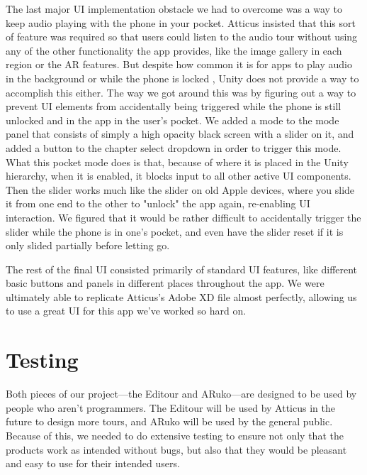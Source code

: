 \documentclass[a4paper, 10pt, american, titlepage]{article}
\begin{document}
The last major UI implementation obstacle we had to overcome was a way to keep
audio playing with the phone in your pocket. Atticus insisted that this sort of
feature was required so that users could listen to the audio tour without using
any of the other functionality the app provides, like the image gallery in each
region or the AR features. But despite how common it is for apps to play audio 
in the background or while the phone is locked , Unity does not provide a way 
to accomplish this either. The way we got around this was by figuring out a way
to prevent UI elements from accidentally being triggered while the phone is 
still unlocked and in the app in the user's pocket. We added a mode to the mode
panel that consists of simply a high opacity black screen with a slider on it,
and added a button to the chapter select dropdown in order to trigger this 
mode. What this pocket mode does is that, because of where it is placed in the 
Unity hierarchy, when it is enabled, it blocks input to all other active UI
components. Then the slider works much like the slider on old Apple devices,
where you slide it from one end to the other to "unlock" the app again, 
re-enabling UI interaction. We figured that it would be rather difficult to 
accidentally trigger the slider while the phone is in one's pocket, and even
have the slider reset if it is only slided partially before letting go. 

The rest of the final UI consisted primarily of standard UI features, like 
different basic buttons and panels in different places throughout the app. 
We were ultimately able to replicate Atticus's Adobe XD file almost 
perfectly, allowing us to use a great UI for this app we've worked so hard on.

\clearpage

\section{Testing}
\label{sec:testing}

Both pieces of our project---the Editour and ARuko---are designed to be used by
people who aren't programmers. The Editour will be used by Atticus in the future
to design more tours, and ARuko will be used by the general public. Because of
this, we needed to do extensive testing to ensure not only that the products
work as intended without bugs, but also that they would be pleasant and easy to
use for their intended users.

\nocite{harvey2002} %
\end{document}
